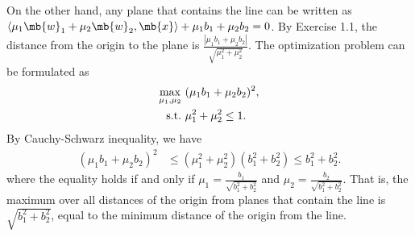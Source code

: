 \begin{exercise}
\begin{enumerate}
\begin{solution}
                On the other hand, any plane that contains the line can be written as $\left\langle \mu_1 \mb{w}_1 + \mu_2 \mb{w}_2 , \mb{x}\right\rangle + \mu_1 b_1 + \mu_2 b_2  = 0$. By Exercise 1.1, the distance from the origin to the plane is $\frac{|\mu_1 b_1 + \mu_2 b_2|}{\sqrt{\mu_1^2 + \mu_2^2}}$. The optimization problem can be formulated as
                \begin{align*}
                    \max_{\mu_1, \mu_2}\  & (\mu_1 b_1 + \mu_2 b_2)^2, \\
                    {\rm s.t.}\           & \mu_1^2 + \mu_2^2
                    \le 1.
                \end{align*}
                By Cauchy-Schwarz inequality, we have
                \begin{align*}
                    (\mu_1 b_1 + \mu_2 b_2)^2 & \le \left(\mu_1^2 + \mu_2^2\right)\left(b_1^2 + b_2^2\right) \le b_1^2 + b_2^2.
                \end{align*}
                where the equality holds if and only if $\mu_1 = \frac{b_1}{\sqrt{b_1^2 + b_2^2}}$ and $\mu_2 = \frac{b_2}{\sqrt{b_1^2 + b_2^2}}$. That is, the maximum over all distances of the origin from planes that contain the line is $\sqrt{b_1^2 + b_2^2}$, equal to the minimum distance of the origin from the line.
            \end{solution}


    \end{enumerate}
\end{exercise}
\clearpage




